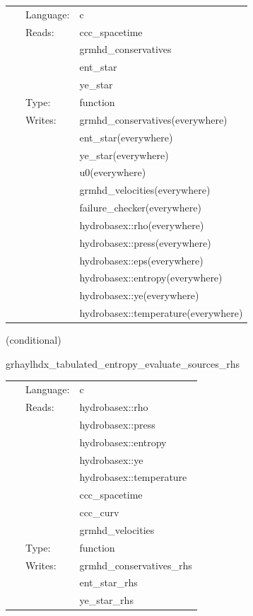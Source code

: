 \documentclass{article}
\begin{document}
\hspace{5mm}

 \begin{tabular*}{160mm}{cll} 
~ & Language:  & c \\ 
~ & Reads:  & ccc\_spacetime \\ 
~& ~ &grmhd\_conservatives\\ 
~& ~ &ent\_star\\ 
~& ~ &ye\_star\\ 
~ & Type:  & function \\ 
~ & Writes:  & grmhd\_conservatives(everywhere) \\ 
~& ~ &ent\_star(everywhere)\\ 
~& ~ &ye\_star(everywhere)\\ 
~& ~ &u0(everywhere)\\ 
~& ~ &grmhd\_velocities(everywhere)\\ 
~& ~ &failure\_checker(everywhere)\\ 
~& ~ &hydrobasex::rho(everywhere)\\ 
~& ~ &hydrobasex::press(everywhere)\\ 
~& ~ &hydrobasex::eps(everywhere)\\ 
~& ~ &hydrobasex::entropy(everywhere)\\ 
~& ~ &hydrobasex::ye(everywhere)\\ 
~& ~ &hydrobasex::temperature(everywhere)\\ 
\end{tabular*} 


\vspace{5mm}

   (conditional) 

\hspace{5mm} grhaylhdx\_tabulated\_entropy\_evaluate\_sources\_rhs 

\hspace{5mm}{\it entropy+tabulated version of grhaylhdx\_evaluate\_sources\_rhs } 


\hspace{5mm}

 \begin{tabular*}{160mm}{cll} 
~ & Language:  & c \\ 
~ & Reads:  & hydrobasex::rho \\ 
~& ~ &hydrobasex::press\\ 
~& ~ &hydrobasex::entropy\\ 
~& ~ &hydrobasex::ye\\ 
~& ~ &hydrobasex::temperature\\ 
~& ~ &ccc\_spacetime\\ 
~& ~ &ccc\_curv\\ 
~& ~ &grmhd\_velocities\\ 
~ & Type:  & function \\ 
~ & Writes:  & grmhd\_conservatives\_rhs \\ 
~& ~ &ent\_star\_rhs\\ 
~& ~ &ye\_star\_rhs\\ 
\end{tabular*} 
\end{document}
